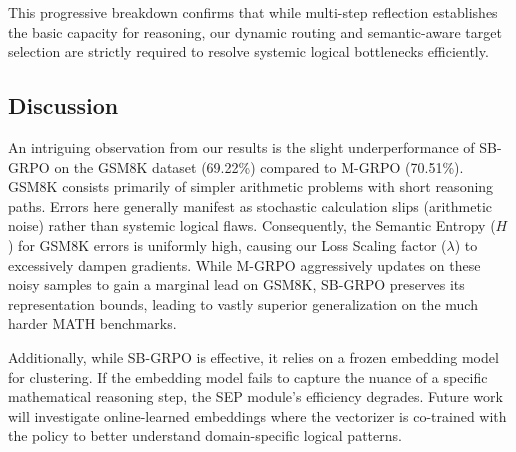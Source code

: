 This progressive breakdown confirms that while multi-step reflection establishes the basic capacity for reasoning, our dynamic routing and semantic-aware target selection are strictly required to resolve systemic logical bottlenecks efficiently.

\subsection{Discussion}
An intriguing observation from our results is the slight underperformance of SB-GRPO on the GSM8K dataset (69.22\%) compared to M-GRPO (70.51\%). GSM8K consists primarily of simpler arithmetic problems with short reasoning paths. Errors here generally manifest as stochastic calculation slips (arithmetic noise) rather than systemic logical flaws. Consequently, the Semantic Entropy ($H$) for GSM8K errors is uniformly high, causing our Loss Scaling factor ($\lambda$) to excessively dampen gradients. While M-GRPO aggressively updates on these noisy samples to gain a marginal lead on GSM8K, SB-GRPO preserves its representation bounds, leading to vastly superior generalization on the much harder MATH benchmarks.

Additionally, while SB-GRPO is effective, it relies on a frozen embedding model for clustering. If the embedding model fails to capture the nuance of a specific mathematical reasoning step, the SEP module's efficiency degrades. Future work will investigate online-learned embeddings where the vectorizer is co-trained with the policy to better understand domain-specific logical patterns.
